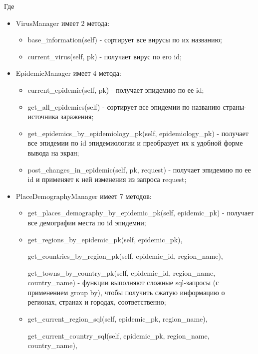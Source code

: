 \documentclass[a4paper,14pt]{extarticle}
\begin{document}
 	Где
 	\begin{itemize}
 		\item VirusManager имеет 2 метода:
 		\begin{itemize}
 			\item base\_information(self) - сортирует все вирусы по их названию;
 			\item current\_virus(self, pk) - получает вирус по его id;
 		\end{itemize}
 		\item EpidemicManager имеет 4 метода:
 		\begin{itemize}
 			\item current\_epidemic(self, pk) - получает эпидемию по ее id;
 			\item get\_all\_epidemics(self) - сортирует все эпидемии по названию страны-источника заражения;
 			\item get\_epidemics\_by\_epidemiology\_pk(self, epidemiology\_pk) - получает все эпидемии по id эпидемиологии и преобразует их к удобной форме вывода на экран;
 			\item post\_changes\_in\_epidemic(self, pk, request) - получает эпидемию по ее id и применяет к ней изменения из запроса request;
 		\end{itemize}
 		\item PlaceDemographyManager имеет 7 методов:
 		\begin{itemize}
 			\item get\_places\_demography\_by\_epidemic\_pk(self, epidemic\_pk) - получает все демографии места по id эпидемии;
 			\item get\_regions\_by\_epidemic\_pk(self, epidemic\_pk),
 			
 			 get\_countries\_by\_region\_pk(self, epidemic\_id, region\_name),
 			 
 			  get\_towns\_by\_country\_pk(self, epidemic\_id, region\_name, country\_name) - функции выполняют сложные sql-запросы (с применением group by), чтобы получить сжатую информацию о регионах, странах и городах, соответственно;
 			\item get\_current\_region\_sql(self, epidemic\_pk, region\_name),
 			
 			 get\_current\_country\_sql(self, epidemic\_pk, region\_name, country\_name),
 			 

\end{itemize}
\end{itemize}
\end{document}
